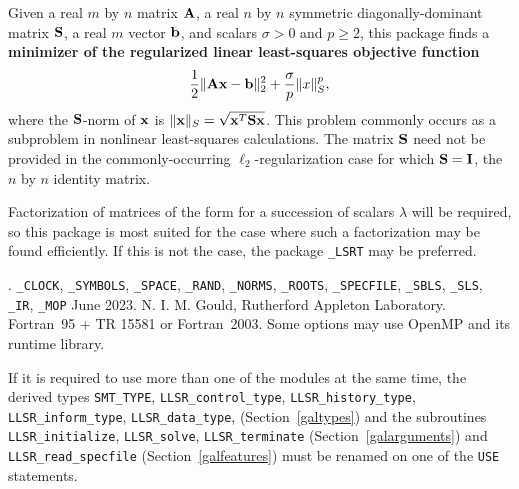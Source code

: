 \documentclass{galahad}
\newcommand{\packagename}{LLSR}
\newcommand{\fullpackagename}{\libraryname\_\packagename}
\begin{document}
\galheader


\galsummary
Given a real $m$ by $n$ matrix ${\mathbf{A}}$,
a real $n$ by $n$ symmetric diagonally-dominant matrix ${\mathbf{S}}$,
a real $m$ vector ${\mathbf{b}}$, and scalars $\sigma>0$ and $p \geq 2$, 
this package finds a
{\bf minimizer of the regularized linear least-squares objective function}
$$\frac{1}{2} \| {\mathbf{A}} {\mathbf{x}}  - {\mathbf{b}} \|^2_2 + \frac{\sigma}{p}\|x\|_S^p,$$
where the ${\mathbf{S}}$-norm of ${\mathbf{x}}$ is $\|{\mathbf{x}}\|_S = \sqrt{{\mathbf{x}}^T {\mathbf{S}} {\mathbf{x}}}$.
This problem commonly occurs as a subproblem in nonlinear
least-squares calculations.
The matrix ${\mathbf{S}}$ need not be provided in the commonly-occurring
$\ell_2$-regularization case for which ${\mathbf{S}} = {\mathbf{I}}$, the $n$ by $n$
identity matrix.

\noindent
Factorization of matrices of the form
for a succession
of scalars $\lambda$ will be required, so this package is most suited
for the case where such a factorization may be found efficiently. If
this is not the case, the package {\tt \libraryname\_LSRT} may be preferred.


\galattributes
\galversions{\tt  \fullpackagename\_single, \fullpackagename\_double}.
\galuses
{\tt \libraryname\_CLOCK},
{\tt \libraryname\_SY\-M\-BOLS},
{\tt \libraryname\_SPACE}, {\tt \libraryname\_\-RAND},
{\tt \libraryname\_\-NORMS},
{\tt \libraryname\_ROOTS}, {\tt \libraryname\_SPECFILE},
{\tt \libraryname\_SBLS},
{\tt \libraryname\_SLS}, {\tt \libraryname\_IR},
{\tt \libraryname\_MOP}
\galdate June 2023.
\galorigin N. I. M. Gould, Rutherford Appleton Laboratory.
\gallanguage Fortran~95 + TR 15581 or Fortran~2003.
\galparallelism Some options may use OpenMP and its runtime library.


\galhowto



\noindent
If it is required to use more than one of the modules at the same time, 
the derived types
{\tt SMT\_TYPE},
{\tt \packagename\_control\_type},
{\tt \packagename\_history\_\-type},
{\tt \packagename\_inform\_type},
{\tt \packagename\_data\_type},
(Section~\ref{galtypes})
and the subroutines
{\tt \packagename\_initialize},
{\tt \packagename\_solve}, {\tt \packagename\_\-terminate}
(Section~\ref{galarguments})
and
{\tt \packagename\_read\_specfile}
(Section~\ref{galfeatures})
must be renamed on one of the {\tt USE} statements.
\end{document}
